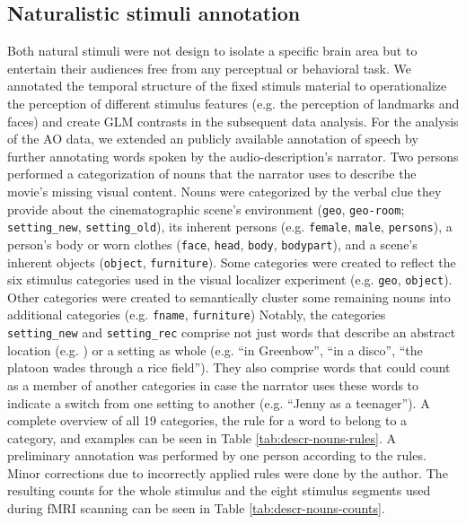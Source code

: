 \documentclass[english]{article}
\begin{document}
\subsection{Naturalistic stimuli annotation}
Both natural stimuli were not design to isolate a specific brain area but to
entertain their audiences free from any perceptual or behavioral task.
We annotated the temporal structure of the fixed stimuls material to
operationalize the perception of different stimulus features (e.g. the
perception of landmarks and faces) and create GLM contrasts in the subsequent
data analysis.
For the analysis of the AO data, we extended an publicly available annotation of
speech \citep{haeusler2020speechanno} by further annotating words spoken by the
audio-description's narrator.
Two persons performed a categorization of nouns that the narrator uses to
describe the movie's missing visual content.
Nouns were categorized by the verbal clue they provide about the cinematographic
scene's environment (\texttt{geo}, \texttt{geo-room}; \texttt{setting\_new},
\texttt{setting\_old}), its inherent persons (e.g. \texttt{female},
\texttt{male}, \texttt{persons}), a person's body or worn clothes
(\texttt{face}, \texttt{head}, \texttt{body}, \texttt{bodypart}), and a scene's
inherent objects (\texttt{object}, \texttt{furniture}).
Some categories were created to reflect the six stimulus categories used in the
visual localizer experiment (e.g. \texttt{geo}, \texttt{object}).
Other categories were created to semantically cluster some remaining nouns into
additional categories (e.g. \texttt{fname}, \texttt{furniture})
Notably, the categories \texttt{setting\_new} and \texttt{setting\_rec} comprise
not just words that describe an abstract location (e.g. ) or a setting as whole
(e.g. ``in Greenbow'', ``in a disco'', ``the platoon wades through a rice
field''). They also comprise words that could count as a member of another
categories in case the narrator uses these words to indicate a switch from one
setting to another (e.g. ``Jenny as a teenager'').
A complete overview of all 19 categories, the rule for a word to belong to a
category, and examples can be seen in Table \ref{tab:descr-nouns-rules}.
A preliminary annotation was performed by one person according to the rules.
Minor corrections due to incorrectly applied rules were done by the author.
The resulting counts for the whole stimulus and the eight stimulus segments used
during fMRI scanning can be seen in Table \ref{tab:descr-nouns-counts}.
\end{document}
